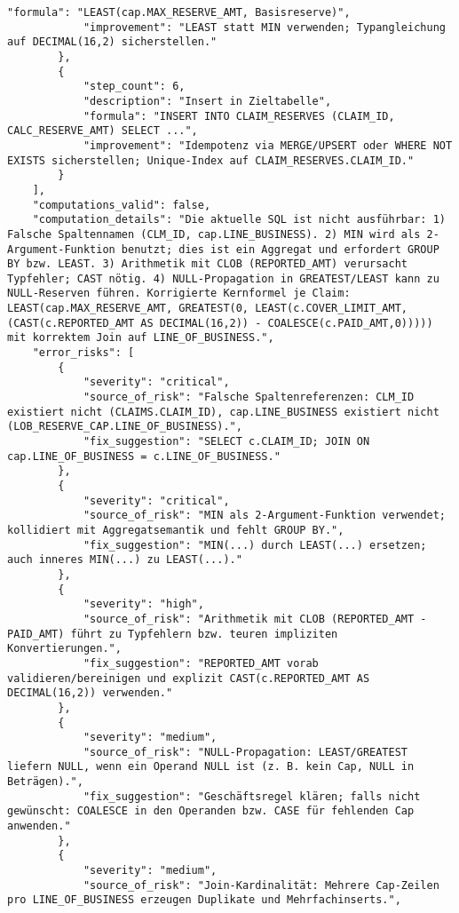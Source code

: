 \begin{lstlisting}[caption={Ausgabe: GPT-5 Anwendungsfall 10 Konsistenzdurchlauf},label={gpt_case10_prompt2}]
            "formula": "LEAST(cap.MAX_RESERVE_AMT, Basisreserve)",
            "improvement": "LEAST statt MIN verwenden; Typangleichung auf DECIMAL(16,2) sicherstellen."
        },
        {
            "step_count": 6,
            "description": "Insert in Zieltabelle",
            "formula": "INSERT INTO CLAIM_RESERVES (CLAIM_ID, CALC_RESERVE_AMT) SELECT ...",
            "improvement": "Idempotenz via MERGE/UPSERT oder WHERE NOT EXISTS sicherstellen; Unique-Index auf CLAIM_RESERVES.CLAIM_ID."
        }
    ],
    "computations_valid": false,
    "computation_details": "Die aktuelle SQL ist nicht ausführbar: 1) Falsche Spaltennamen (CLM_ID, cap.LINE_BUSINESS). 2) MIN wird als 2-Argument-Funktion benutzt; dies ist ein Aggregat und erfordert GROUP BY bzw. LEAST. 3) Arithmetik mit CLOB (REPORTED_AMT) verursacht Typfehler; CAST nötig. 4) NULL-Propagation in GREATEST/LEAST kann zu NULL-Reserven führen. Korrigierte Kernformel je Claim: LEAST(cap.MAX_RESERVE_AMT, GREATEST(0, LEAST(c.COVER_LIMIT_AMT, (CAST(c.REPORTED_AMT AS DECIMAL(16,2)) - COALESCE(c.PAID_AMT,0))))) mit korrektem Join auf LINE_OF_BUSINESS.",
    "error_risks": [
        {
            "severity": "critical",
            "source_of_risk": "Falsche Spaltenreferenzen: CLM_ID existiert nicht (CLAIMS.CLAIM_ID), cap.LINE_BUSINESS existiert nicht (LOB_RESERVE_CAP.LINE_OF_BUSINESS).",
            "fix_suggestion": "SELECT c.CLAIM_ID; JOIN ON cap.LINE_OF_BUSINESS = c.LINE_OF_BUSINESS."
        },
        {
            "severity": "critical",
            "source_of_risk": "MIN als 2-Argument-Funktion verwendet; kollidiert mit Aggregatsemantik und fehlt GROUP BY.",
            "fix_suggestion": "MIN(...) durch LEAST(...) ersetzen; auch inneres MIN(...) zu LEAST(...)."
        },
        {
            "severity": "high",
            "source_of_risk": "Arithmetik mit CLOB (REPORTED_AMT - PAID_AMT) führt zu Typfehlern bzw. teuren impliziten Konvertierungen.",
            "fix_suggestion": "REPORTED_AMT vorab validieren/bereinigen und explizit CAST(c.REPORTED_AMT AS DECIMAL(16,2)) verwenden."
        },
        {
            "severity": "medium",
            "source_of_risk": "NULL-Propagation: LEAST/GREATEST liefern NULL, wenn ein Operand NULL ist (z. B. kein Cap, NULL in Beträgen).",
            "fix_suggestion": "Geschäftsregel klären; falls nicht gewünscht: COALESCE in den Operanden bzw. CASE für fehlenden Cap anwenden."
        },
        {
            "severity": "medium",
            "source_of_risk": "Join-Kardinalität: Mehrere Cap-Zeilen pro LINE_OF_BUSINESS erzeugen Duplikate und Mehrfachinserts.",

\end{lstlisting}
